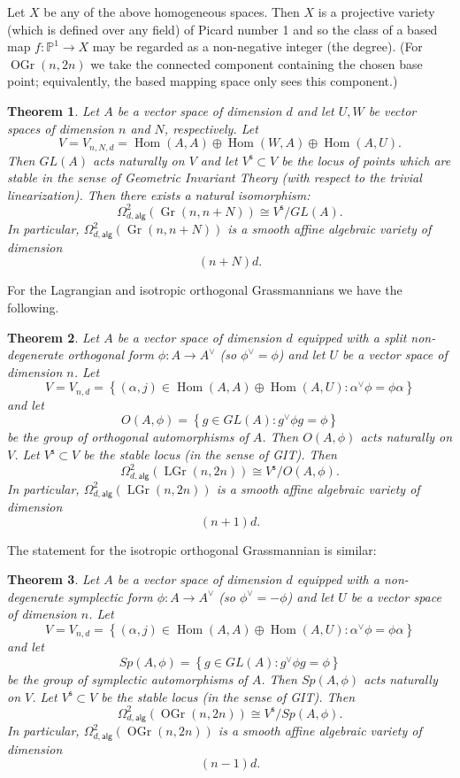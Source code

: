\documentclass{amsart}
\newtheorem{theorem}{Theorem}[section]
\theoremstyle{definition}
\newcommand{\PP}{\mathbb{P}}
\newcommand{\Hom}{\operatorname{Hom}}
\newcommand{\alg}{\mathsf{alg}}
\newcommand{\stable}{\mathsf{s}}
\newcommand{\Gr}{\operatorname{Gr}}
\newcommand{\LGr}{\operatorname{LGr}}
\newcommand{\OGr}{\operatorname{OGr}}
\newcommand{\LoopTwo}{\Omega^{2}_{d,\alg}}
\begin{document}
Let $X$ be any of the above homogeneous spaces. Then $X$
is a projective variety (which is defined over any field) of
Picard number 1 and so the class of a based map $f:\PP^{1}\to X$ may
be regarded as a non-negative integer (the degree).  (For $\OGr
(n,2n)$ we take the connected component containing the chosen base
point; equivalently, the based mapping space only sees this component.)



\begin{theorem}\label{thm: quiver description of Loop2alg(Gr(n,n+N))}
Let $A$ be a vector space of dimension $d$ and let $U,W$ be vector
spaces of dimension $n$ and $N$, respectively. Let
\[
V=V_{n,N,d} =\Hom (A,A)\oplus \Hom (W,A)\oplus \Hom (A,U).
\]
Then $GL(A)$ acts naturally on $V$ and let $V^{\stable}\subset V$ be
the locus of points which are stable in the sense of Geometric
Invariant Theory (with respect to the trivial linearization). Then
there exists a natural isomorphism:
\[
\LoopTwo (\Gr (n,n+N))\cong V^{\stable}/GL(A).
\]
In particular, $\LoopTwo (\Gr (n,n+N))$ is a smooth affine algebraic
variety of dimension 
\[
(n+N)d.
\]
\end{theorem}

For the Lagrangian and isotropic orthogonal Grassmannians we have the following.

\begin{theorem}\label{thm: quiver description of Loop2Alg(LGr)}
Let $A$ be a vector space of dimension $d$ equipped with a split
non-degenerate orthogonal form $\phi :A\to A^{\vee}$ (so
$\phi^{\vee}=\phi$) and let $U$ be a vector space of dimension
$n$. Let
\[
V=V_{n,d}=\left\{(\alpha ,j)\in \Hom (A,A)\oplus \Hom (A,U):
\alpha^{\vee}\phi =\phi \alpha \right\} 
\]
and let 
\[
O(A,\phi ) = \left\{g\in GL(A):g^{\vee}\phi g=\phi  \right\}
\]
be the group of orthogonal automorphisms of $A$. Then $O(A,\phi )$ acts
naturally on $V$.  Let $V^{\stable}\subset V$ be the stable
locus (in the sense of GIT). Then
\[
\LoopTwo (\LGr(n,2n))\cong V^{\stable}/O(A,\phi ). 
\]
In particular, $\LoopTwo (\LGr (n,2n))$ is a smooth affine algebraic
variety of dimension 
\[
(n+1)d.
\]
\end{theorem}

The statement for the isotropic orthogonal Grassmannian is similar:


\begin{theorem}\label{thm: quiver description of Loop2Alg(OGr)}
Let $A$ be a vector space of dimension $d$ equipped with a
non-degenerate symplectic form $\phi :A\to A^{\vee}$ (so
$\phi^{\vee}=-\phi$) and let $U$ be a vector space of dimension
$n$. Let
\[
V=V_{n,d}=\left\{(\alpha ,j)\in \Hom (A,A)\oplus \Hom (A,U):
\alpha^{\vee}\phi =\phi \alpha \right\} 
\]
and let 
\[
Sp(A,\phi ) = \left\{g\in GL(A):g^{\vee}\phi g=\phi  \right\}
\]
be the group of symplectic automorphisms of $A$. Then $Sp(A,\phi )$ acts
naturally on $V$.  Let $V^{\stable}\subset V$ be the stable
locus (in the sense of GIT). Then
\[
\LoopTwo (\OGr(n,2n))\cong V^{\stable}/Sp(A,\phi ). 
\]
In particular, $\LoopTwo (\OGr (n,2n))$ is a smooth affine algebraic
variety of dimension 
\[
(n-1)d.
\]
\end{theorem}
\end{document}
